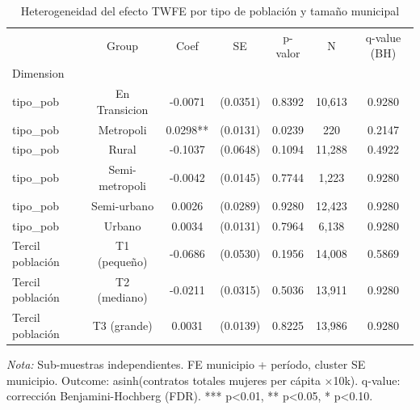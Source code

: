 \begin{table}[htbp]
\centering
\small
\caption{Heterogeneidad del efecto TWFE por tipo de población y tamaño municipal}
\label{tab:heterogeneity}
\begin{tabular}{lcccccc}
\toprule
 & Group & Coef & SE & p-valor & N & q-value (BH) \\
Dimension &  &  &  &  &  &  \\
\midrule
tipo\_pob & En Transicion & -0.0071 & (0.0351) & 0.8392 & 10,613 & 0.9280 \\
tipo\_pob & Metropoli & 0.0298** & (0.0131) & 0.0239 & 220 & 0.2147 \\
tipo\_pob & Rural & -0.1037 & (0.0648) & 0.1094 & 11,288 & 0.4922 \\
tipo\_pob & Semi-metropoli & -0.0042 & (0.0145) & 0.7744 & 1,223 & 0.9280 \\
tipo\_pob & Semi-urbano & 0.0026 & (0.0289) & 0.9280 & 12,423 & 0.9280 \\
tipo\_pob & Urbano & 0.0034 & (0.0131) & 0.7964 & 6,138 & 0.9280 \\
Tercil población & T1 (pequeño) & -0.0686 & (0.0530) & 0.1956 & 14,008 & 0.5869 \\
Tercil población & T2 (mediano) & -0.0211 & (0.0315) & 0.5036 & 13,911 & 0.9280 \\
Tercil población & T3 (grande) & 0.0031 & (0.0139) & 0.8225 & 13,986 & 0.9280 \\
\bottomrule
\end{tabular}
\vspace{2mm}
\parbox{\textwidth}{\footnotesize \textit{Nota:} Sub-muestras independientes. FE municipio + período, cluster SE municipio. Outcome: asinh(contratos totales mujeres per cápita ×10k). q-value: corrección Benjamini-Hochberg (FDR). *** p<0.01, ** p<0.05, * p<0.10.}
\end{table}